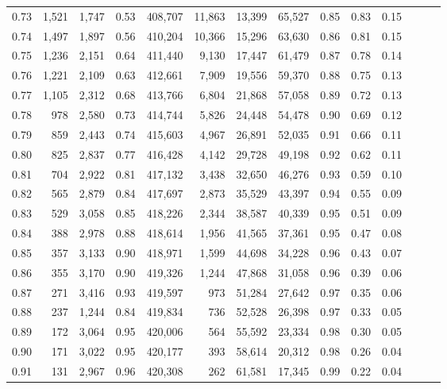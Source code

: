 \begin{tabular}{rrrrrrrrrrrrrr}
0.73 &  1,521 &  1,747 &  0.53 &  408,707 &   11,863 &  13,399 &  65,527 &  0.85 &  0.83 &      0.15 \\
0.74 &  1,497 &  1,897 &  0.56 &  410,204 &   10,366 &  15,296 &  63,630 &  0.86 &  0.81 &      0.15 \\
0.75 &  1,236 &  2,151 &  0.64 &  411,440 &    9,130 &  17,447 &  61,479 &  0.87 &  0.78 &      0.14 \\
0.76 &  1,221 &  2,109 &  0.63 &  412,661 &    7,909 &  19,556 &  59,370 &  0.88 &  0.75 &      0.13 \\
0.77 &  1,105 &  2,312 &  0.68 &  413,766 &    6,804 &  21,868 &  57,058 &  0.89 &  0.72 &      0.13 \\
0.78 &    978 &  2,580 &  0.73 &  414,744 &    5,826 &  24,448 &  54,478 &  0.90 &  0.69 &      0.12 \\
0.79 &    859 &  2,443 &  0.74 &  415,603 &    4,967 &  26,891 &  52,035 &  0.91 &  0.66 &      0.11 \\
0.80 &    825 &  2,837 &  0.77 &  416,428 &    4,142 &  29,728 &  49,198 &  0.92 &  0.62 &      0.11 \\
0.81 &    704 &  2,922 &  0.81 &  417,132 &    3,438 &  32,650 &  46,276 &  0.93 &  0.59 &      0.10 \\
0.82 &    565 &  2,879 &  0.84 &  417,697 &    2,873 &  35,529 &  43,397 &  0.94 &  0.55 &      0.09 \\
0.83 &    529 &  3,058 &  0.85 &  418,226 &    2,344 &  38,587 &  40,339 &  0.95 &  0.51 &      0.09 \\
0.84 &    388 &  2,978 &  0.88 &  418,614 &    1,956 &  41,565 &  37,361 &  0.95 &  0.47 &      0.08 \\
0.85 &    357 &  3,133 &  0.90 &  418,971 &    1,599 &  44,698 &  34,228 &  0.96 &  0.43 &      0.07 \\
0.86 &    355 &  3,170 &  0.90 &  419,326 &    1,244 &  47,868 &  31,058 &  0.96 &  0.39 &      0.06 \\
0.87 &    271 &  3,416 &  0.93 &  419,597 &      973 &  51,284 &  27,642 &  0.97 &  0.35 &      0.06 \\
0.88 &    237 &  1,244 &  0.84 &  419,834 &      736 &  52,528 &  26,398 &  0.97 &  0.33 &      0.05 \\
0.89 &    172 &  3,064 &  0.95 &  420,006 &      564 &  55,592 &  23,334 &  0.98 &  0.30 &      0.05 \\
0.90 &    171 &  3,022 &  0.95 &  420,177 &      393 &  58,614 &  20,312 &  0.98 &  0.26 &      0.04 \\
0.91 &    131 &  2,967 &  0.96 &  420,308 &      262 &  61,581 &  17,345 &  0.99 &  0.22 &      0.04 \\

\end{tabular}
